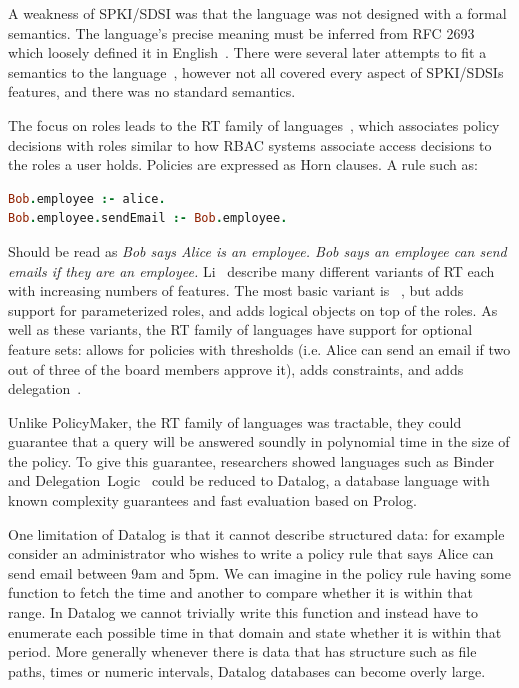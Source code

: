 \documentclass[thesis.tex]{subfiles}
\begin{document}
A weakness of SPKI/SDSI was that the language was not designed
with a formal semantics.  The language's precise meaning must be inferred from
RFC 2693 which loosely defined it in English~\cite{ellison_spki_1999}. There were
several later attempts to fit a semantics to the
language~\cite{joseph_y._halpern_logic_1999,abadi_sdsis_1998,howell_formal_2000,dwaine_clarke_certificate_2001},
however not all covered every aspect of SPKI/SDSIs features, and there was no standard semantics.

The focus on roles leads to the RT family of
languages~\cite{ninghui_li_design_2002}, which associates policy
decisions with roles similar to how \ac{RBAC} systems associate access
decisions to the roles a user holds.  Policies are expressed as Horn
clauses.  A rule such as:

\begin{lstlisting}[language=prolog]
Bob.employee :- alice.
Bob.employee.sendEmail :- Bob.employee.
\end{lstlisting}

Should be read as \emph{Bob says Alice is an employee.  Bob says an
employee can send emails if they are an employee.}  Li~\etal{}
describe many different variants of RT each with increasing numbers of
features.  The most basic variant is
~\cite{li_distributed_2003}, but  adds support for
parameterized roles, and  adds logical objects on top of the
roles.  As well as these variants, the RT family of languages have
support for optional feature sets:  allows for policies with
thresholds (i.e. Alice can send an email if two out of three of the
board members approve it),  adds constraints, and 
adds delegation~\cite{ninghui_li_design_2002}.

Unlike PolicyMaker, the RT family of languages was tractable, they could
guarantee that a query will be answered soundly in polynomial time in the size
of the policy. To give this guarantee, researchers showed languages such as
Binder~\cite{detreville_binder_2002} and
Delegation~Logic~\cite{li_delegation_2003,li_practically_2000} could be reduced
to Datalog, a database language with known complexity guarantees and fast
evaluation based on Prolog.

One limitation of Datalog is that it cannot describe structured data: for
example consider an administrator who wishes to write a policy rule that says
Alice can send email between 9am and 5pm. We can imagine in the policy rule
having some function to fetch the time and another to compare whether it is
within that range. In Datalog we cannot trivially write this function and
instead have to enumerate each possible time in that domain and state whether it
is within that period. More generally whenever there is data that has structure
such as file paths, times or numeric intervals, Datalog databases can become
overly large.
\end{document}
